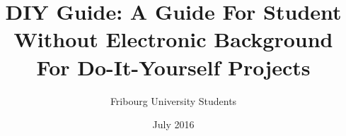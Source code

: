 \documentclass[a4paper,12pt]{book}
\begin{document}
\author{Fribourg University Students}
\title{DIY Guide: A Guide For Student Without Electronic Background For Do-It-Yourself Projects}
\date{July 2016}

\frontmatter
\maketitle
\tableofcontents

\mainmatter



\backmatter
\end{document}
